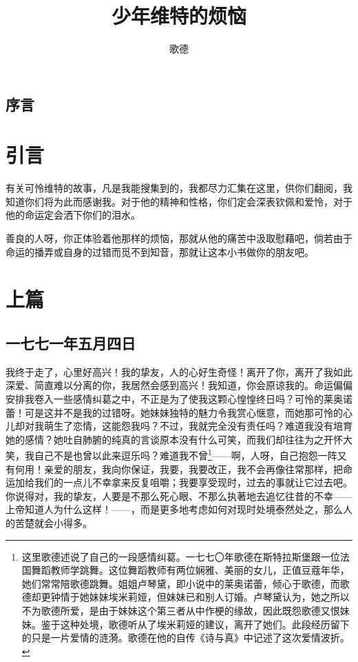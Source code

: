 \documentclass[12pt,oneside]{book}
\title{少年维特的烦恼}
\author{歌德}
\begin{document}



\frontmatter 
{}
\chapter*{序言}


\setcounter{tocdepth}{2}    
\tableofcontents



\mainmatter
\part{引言}

\begin{framed}
有关可怜维特的故事，凡是我能搜集到的，我都尽力汇集在这里，供你们翻阅，我知道你们将为此而感谢我。对于他的精神和性格，你们定会深表钦佩和爱怜，对于他的命运定会洒下你们的泪水。

善良的人呀，你正体验着他那样的烦恼，那就从他的痛苦中汲取慰藉吧，倘若由于命运的播弄或自身的过错而觅不到知音，那就让这本小书做你的朋友吧。
\end{framed}




\mainmatter
\part{上篇}


\chapter{一七七一年五月四日}
我终于走了，心里好高兴！我的挚友，人的心好生奇怪！离开了你，离开了我如此深爱、简直难以分离的你，我居然会感到高兴！我知道，你会原谅我的。命运偏偏安排我卷入一些感情纠葛之中，不正是为了使我这颗心惶惶终日吗？可怜的莱奥诺蕾！可是这并不是我的过错呀。她妹妹独特的魅力令我赏心惬意，而她那可怜的心儿却对我萌生了恋情，这能怨我吗？不过，我就完全没有责任吗？难道我没有培育她的感情？她吐自肺腑的纯真的言谈原本没有什么可笑，而我们却往往为之开怀大笑，我自己不是也曾以此来逗乐吗？难道我不曾\footnote{这里歌德述说了自己的一段感情纠葛。一七七〇年歌德在斯特拉斯堡跟一位法国舞蹈教师学跳舞。这位舞蹈教师有两位娴雅、美丽的女儿，正值豆蔻年华，她们常常陪歌德跳舞。姐姐卢琴黛，即小说中的莱奥诺蕾，倾心于歌德，而歌德却更钟情于她妹妹埃米莉娅，但妹妹已和别人订婚。卢琴黛认为，她之所以不为歌德所爱，是由于妹妹这个第三者从中作梗的缘故，因此既怨歌德又恨妹妹。鉴于这种处境，歌德听从了埃米莉娅的建议，离开了她们。此段经历留下的只是一片爱情的涟漪。歌德在他的自传《诗与真》中记述了这次爱情波折。}——啊，人呀，自己抱怨一阵又有何用！亲爱的朋友，我向你保证，我要，我要改正，我不会再像往常那样，把命运加给我们的一点儿不幸拿来反复咀嚼；我要享受现时，过去的事就让它过去吧。你说得对，我的挚友，人要是不那么死心眼、不那么执著地去追忆往昔的不幸——上帝知道人为什么这样！——，而是更多地考虑如何对现时处境泰然处之，那么人的苦楚就会小得多。
\end{document}

